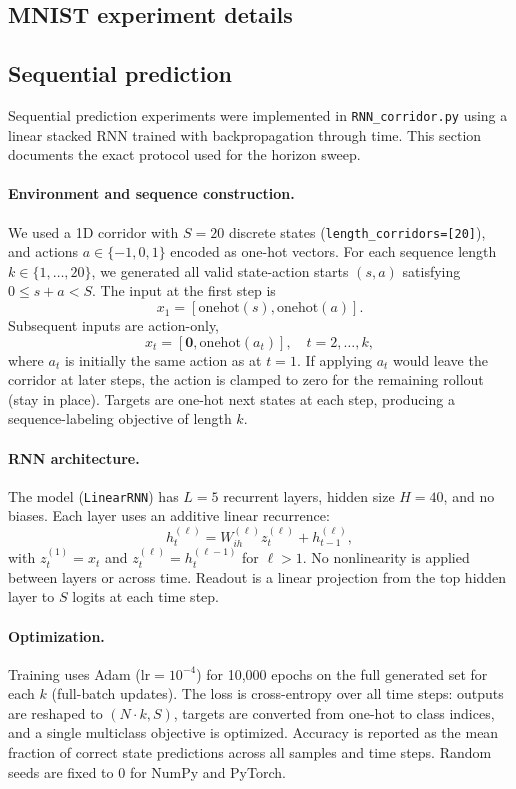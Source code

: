 \documentclass{article}
\begin{document}
\subsection{MNIST experiment details}



\subsection{Sequential prediction}
\label{sec:appendix_sequential_prediction}
Sequential prediction experiments were implemented in \texttt{RNN\_corridor.py}
using a linear stacked RNN trained with backpropagation through time.
This section documents the exact protocol used for the horizon sweep.

\paragraph{Environment and sequence construction.}
We used a 1D corridor with \(S=20\) discrete states
(\texttt{length\_corridors=[20]}), and actions \(a \in \{-1,0,1\}\) encoded as one-hot vectors.
For each sequence length \(k \in \{1,\dots,20\}\), we generated all valid
state-action starts \((s,a)\) satisfying \(0 \le s+a < S\).
The input at the first step is
\[
x_1 = [\mathrm{onehot}(s),\mathrm{onehot}(a)].
\]
Subsequent inputs are action-only,
\[
x_t = [\mathbf{0},\mathrm{onehot}(a_t)], \quad t=2,\dots,k,
\]
where \(a_t\) is initially the same action as at \(t=1\).
If applying \(a_t\) would leave the corridor at later steps, the action is clamped to
zero for the remaining rollout (stay in place).
Targets are one-hot next states at each step, producing a sequence-labeling objective of length \(k\).

\paragraph{RNN architecture.}
The model (\texttt{LinearRNN}) has \(L=5\) recurrent layers, hidden size \(H=40\), and no biases.
Each layer uses an additive linear recurrence:
\[
h_t^{(\ell)} = W_{ih}^{(\ell)} z_t^{(\ell)} + h_{t-1}^{(\ell)},
\]
with \(z_t^{(1)}=x_t\) and \(z_t^{(\ell)}=h_t^{(\ell-1)}\) for \(\ell>1\).
No nonlinearity is applied between layers or across time.
Readout is a linear projection from the top hidden layer to \(S\) logits at each time step.

\paragraph{Optimization.}
Training uses Adam (\(\mathrm{lr}=10^{-4}\)) for 10,000 epochs on the full generated set for each \(k\)
(full-batch updates).
The loss is cross-entropy over all time steps:
outputs are reshaped to \((N\!\cdot\!k, S)\), targets are converted from one-hot to class indices,
and a single multiclass objective is optimized.
Accuracy is reported as the mean fraction of correct state predictions across all samples and time steps.
Random seeds are fixed to 0 for NumPy and PyTorch.
\end{document}

